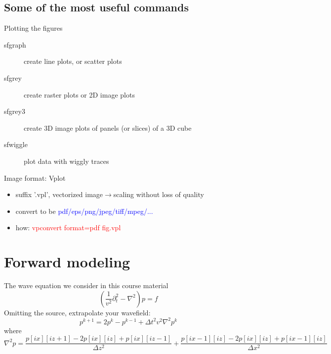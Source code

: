 \subsection{Some of the most useful commands}

Plotting the figures
    \begin{description}
      \item[sfgraph]		create line plots, or scatter plots
      \item[sfgrey] 		create raster plots or 2D image plots
      \item[sfgrey3] 	create 3D image plots of panels (or slices) of a 3D cube
      \item[sfwiggle] 	plot data with wiggly traces 
    \end{description}

  Image format: Vplot
  \begin{itemize}
  \item suffix '.vpl', vectorized image$\rightarrow$scaling without loss of quality
  \item convert to be \textcolor{blue}{pdf/eps/png/jpeg/tiff/mpeg/...}
  \item how: \textcolor{red}{vpconvert format=pdf fig.vpl}
  \end{itemize}


\section{Forward modeling}
The wave equation we consider in this course material
\begin{equation}\label{stateeq}
(\frac{1}{v^2}\partial_t^2 - \nabla^2 ) p=f
\end{equation}
Omitting the source, extrapolate your wavefield:
\begin{equation}\label{forwardupdate}
 p^{k+1}=2p^{k}-p^{k-1}+\Delta t^2 v^2 \nabla^2 p^k 
\end{equation}
where
\begin{equation}
 \nabla^2 p= \frac{p[ix][iz+1]-2p[ix][iz]+p[ix][iz-1]}{\Delta z^2} +\frac{p[ix-1][iz]-2p[ix][iz]+p[ix-1][iz]}{\Delta x^2}
\end{equation}


